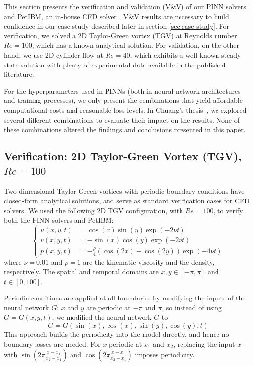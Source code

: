 
This section presents the verification and validation (V\&V) of our PINN solvers and PetIBM, an in-house CFD solver \cite{chuang_petibm_2018}.
V\&V results are necessary to build confidence in our case study described later in section \ref{sec:case-study}.
For verification, we solved a 2D Taylor-Green vortex (TGV) at Reynolds number $Re=\num{100}$, which has a known analytical solution.
For validation, on the other hand, we use 2D cylinder flow at $Re=40$, which exhibits a well-known steady state solution with plenty of experimental data available in the published literature.

For the hyperparameters used in PINNs (both in neural network architectures and training processes), we only present the combinations that yield affordable computational costs and reasonable loss levels.
In Chuang's thesis~\cite{chuang_thesis_2023}, we explored several different combinations to evaluate their impact on the results.
None of these combinations altered the findings and conclusions presented in this paper.

\subsection{Verification: 2D Taylor-Green Vortex (TGV), $Re=\num{100}$}\label{sec:verification}

Two-dimensional Taylor-Green vortices with periodic boundary conditions have closed-form analytical solutions,
and serve as standard verification cases for CFD solvers.
We used the following 2D TGV configuration, with $Re=\num{100}$, to verify both the PINN solvers and PetIBM:
\begin{equation}\label{eq:tgv}
    \left\{
        \begin{aligned}
            u(x, y, t) &= \cos(x)\sin(y)\exp(-2 \nu t) \\
            v(x, y, t) &= - \sin(x)\cos(y)\exp(-2 \nu t) \\
            p(x, y, t) &= -\frac{\rho}{4}\left(\cos(2x) + \cos(2y)\right)\exp(-4 \nu t)
        \end{aligned}
    \right.
\end{equation}
where $\nu=\num{0.01}$ and $\rho=\num{1}$ are the kinematic viscosity and the density, respectively.
The spatial and temporal domains are $x, y \in \left[-\pi, \pi\right]$ and $t \in [0, 100]$.

Periodic conditions are applied at all boundaries by modifying the inputs of the neural network $G$: $x$ and $y$ are periodic at $-\pi$ and $\pi$, so instead of using $G=G(x, y, t)$, we modified the neural network $G$ to
\begin{equation}\label{eq:periodic-bc}
    G = G(\sin(x), \cos(x), \sin(y), \cos(y), t)
\end{equation}
This approach builds the periodicity into the model directly, and hence no boundary losses are needed.
For $x$ periodic at $x_1$ and $x_2$, replacing the input $x$ with $\sin({2\pi\frac{x-x_1}{x_2-x_1}})$ and $\cos({2\pi\frac{x-x_1}{x_2-x_1}})$ imposes periodicity.

